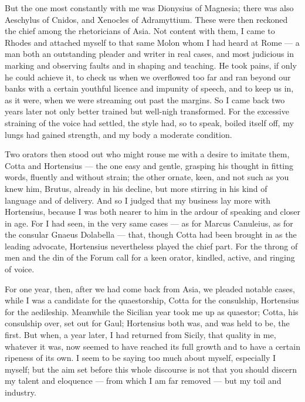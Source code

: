  But the one most constantly with me was Dionysius of Magnesia; there was also Aeschylus of Cnidos, and Xenocles of Adramyttium. These were then reckoned the chief among the rhetoricians of Asia. Not content with them, I came to Rhodes and attached myself to that same Molon whom I had heard at Rome — a man both an outstanding pleader and writer in real cases, and most judicious in marking and observing faults and in shaping and teaching. He took pains, if only he could achieve it, to check us when we overflowed too far and ran beyond our banks with a certain youthful licence and impunity of speech, and to keep us in, as it were, when we were streaming out past the margins. So I came back two years later not only better trained but well-nigh transformed. For the excessive straining of the voice had settled, the style had, so to speak, boiled itself off, my lungs had gained strength, and my body a moderate condition.

 Two orators then stood out who might rouse me with a desire to imitate them, Cotta and Hortensius — the one easy and gentle, grasping his thought in fitting words, fluently and without strain; the other ornate, keen, and not such as you knew him, Brutus, already in his decline, but more stirring in his kind of language and of delivery. And so I judged that my business lay more with Hortensius, because I was both nearer to him in the ardour of speaking and closer in age. For I had seen, in the very same cases — as for Marcus Canuleius, as for the consular Gnaeus Dolabella — that, though Cotta had been brought in as the leading advocate, Hortensius nevertheless played the chief part. For the throng of men and the din of the Forum call for a keen orator, kindled, active, and ringing of voice.

 For one year, then, after we had come back from Asia, we pleaded notable cases, while I was a candidate for the quaestorship, Cotta for the consulship, Hortensius for the aedileship. Meanwhile the Sicilian year took me up as quaestor; Cotta, his consulship over, set out for Gaul; Hortensius both was, and was held to be, the first. But when, a year later, I had returned from Sicily, that quality in me, whatever it was, now seemed to have reached its full growth and to have a certain ripeness of its own. I seem to be saying too much about myself, especially I myself; but the aim set before this whole discourse is not that you should discern my talent and eloquence — from which I am far removed — but my toil and industry.

